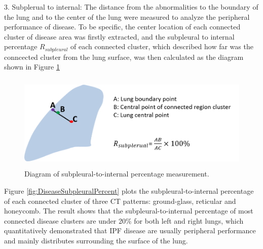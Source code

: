 3. Subplerual to internal: The distance from the abnormalities to the boundary of the lung and to the center of the lung were measured to analyze the peripheral performance of disease. To be specific, the center location of each connected cluster of disease area was firstly extracted, and the subpleural to internal percentage $R_{subpleural}$ of each connected cluster, which described how far was the conncected cluster from the lung surface, was then calculated as the diagram shown in Figure \ref{fig:SubpleuralMethod}

\begin{figure}[H]
  \centering 
  \includegraphics[height=1.8in]{QuantitativeAnalysis/Image/SubplesrualMethod.png}
  \caption{Diagram of subpleural-to-internal percentage measurement.}
  \label{fig:SubpleuralMethod}
\end{figure}
%

Figure \ref{fig:DiseaseSubpleuralPercent} plots the subpleural-to-internal percentage of each connected cluster of three CT patterns: ground-glass, reticular and honeycomb. The result shows that the subpleural-to-internal percentage of most connected disease clusters are under 20\% for both left and right lungs, which quantitatively demonstrated that IPF disease are usually peripheral performance and mainly distributes surrounding the surface of the lung.

